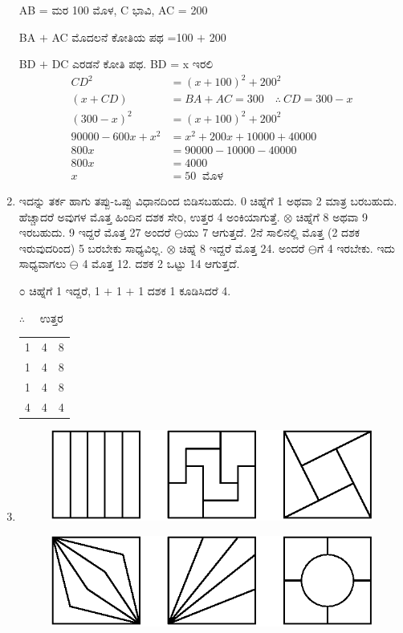 \begin{enumerate}
AB =  ಮರ 100 ಮೊಳ, C ಭಾವಿ, AC = 200

BA $+$ AC ಮೊದಲನೆ ಕೋತಿಯ ಪಥ =100 $+$ 200

BD $+$ DC ಎರಡನೆ ಕೋತಿ ಪಥ. BD = x ಇರಲಿ 
\begin{align*}
CD^{2} & = (x + 100)^{2} + 200^{2}\\
(x+CD) & = BA + AC = 300 \quad\therefore~ CD = 300 - x\\
(300 - x)^{2} & = (x + 100)^{2} + 200^{2}\\
90000 - 600x + x^{2} & = x^{2} + 200x + 10000 + 40000\\
800x & = 90000 - 10000 - 40000\\
800x & = 4000\\
x & = 50 ~\text{ ಮೊಳ}
\end{align*}

\item ಇದನ್ನು ತರ್ಕ ಹಾಗು ತಪ್ಪು-ಒಪ್ಪು ವಿಧಾನದಿಂದ ಬಿಡಿಸಬಹುದು. 0 ಚಿಹ್ನೆಗೆ 1 ಅಥವಾ 2 ಮಾತ್ರ ಬರಬಹುದು. ಹೆಚ್ಚಾದರೆ ಅವುಗಳ ಮೊತ್ತ ಹಿಂದಿನ ದಶಕ ಸೇರಿ, ಉತ್ತರ 4 ಅಂಕಿಯಾಗುತ್ತೆ. $\otimes$ ಚಿಹ್ನೆಗೆ 8 ಅಥವಾ 9 ಇರಬಹುದು. 9 ಇದ್ದರೆ ಮೊತ್ತ 27 ಅಂದರೆ $\ominus$ಯು 7 ಆಗುತ್ತದೆ. 2ನೆ ಸಾಲಿನಲ್ಲಿ ಮೊತ್ತ (2 ದಶಕ ಇರುವುದರಿಂದ) 5 ಬರಬೇಕು ಸಾಧ್ಯವಿಲ್ಲ. $\otimes$ ಚಿಹ್ನೆ 8 ಇದ್ದರೆ ಮೊತ್ತ 24. ಅಂದರೆ $\ominus$ಗೆ 4 ಇರಬೇಕು. ಇದು ಸಾಧ್ಯವಾಗಲು $\ominus$ 4 ಮೊತ್ತ 12. ದಶಕ 2 ಒಟ್ಟು 14 ಆಗುತ್ತದೆ. 

೦ ಚಿಹ್ನೆಗೆ 1 ಇದ್ದರೆ, 1 $+$ 1 $+$ 1 ದಶಕ 1 ಕೂಡಿಸಿದರೆ 4. 

$\therefore\quad$ ಉತ್ತರ
\begin{tabular}[t]{lll}
1 & 4 & 8\\
1 & 4 & 8\\
1 & 4 & 8\\
\hline
4 & 4 & 4\\
\end{tabular}

\item
\begin{figure}[H]
\centering
\includegraphics{images/chap12/ans25a.eps}
\end{figure} 

\begin{figure}[H]
\centering
\includegraphics{images/chap12/ans25b.eps}
\end{figure} 



\end{enumerate}
